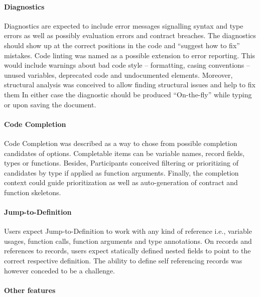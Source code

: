 \documentclass[
  a4paper,
  bibtex,
  english,
  nomenclature]{kthlatex/kththesis/kththesis}
\begin{document}
\hypertarget{sec:diagnostics-1}{%
\paragraph{Diagnostics}\label{sec:diagnostics-1}}

Diagnostics are expected to include error messages signalling syntax and
type errors as well as possibly evaluation errors and contract breaches.
The diagnostics should show up at the correct positions in the code and
``suggest how to fix'' mistakes. Code linting was named as a possible
extension to error reporting. This would include warnings about bad code
style -- formatting, casing conventions -- unused variables, deprecated
code and undocumented elements. Moreover, structural analysis was
conceived to allow finding structural issues and help to fix them In
either case the diagnostic should be produced ``On-the-fly'' while
typing or upon saving the document.

\hypertarget{sec:code-completion-1}{%
\paragraph{Code Completion}\label{sec:code-completion-1}}

Code Completion was described as a way to chose from possible completion
candidates of options. Completable items can be variable names, record
fields, types or functions. Besides, Participants conceived filtering or
prioritizing of candidates by type if applied as function arguments.
Finally, the completion context could guide prioritization as well as
auto-generation of contract and function skeletons.

\hypertarget{sec:jump-to-definition-1}{%
\paragraph{Jump-to-Definition}\label{sec:jump-to-definition-1}}

Users expect Jump-to-Definition to work with any kind of reference i.e.,
variable usages, function calls, function arguments and type
annotations. On records and references to records, users expect
statically defined nested fields to point to the correct respective
definition. The ability to define self referencing records was however
conceded to be a challenge.

\hypertarget{sec:other-features}{%
\paragraph{Other features}\label{sec:other-features}}
\end{document}

